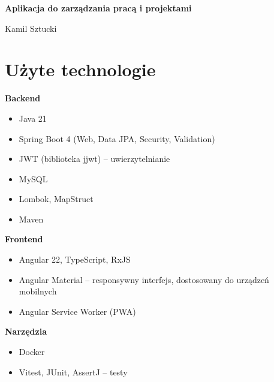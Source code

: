 \documentclass[12pt,a4paper]{article}
\begin{document}
\begin{center}
  {\LARGE \textbf{Aplikacja do zarządzania pracą i projektami}}
\end{center}

\vspace{1em}

Kamil Sztucki
\section*{Użyte technologie}

\textbf{Backend}
\begin{itemize}
  \item Java 21
  \item Spring Boot 4 (Web, Data JPA, Security, Validation)
  \item JWT (biblioteka jjwt) -- uwierzytelnianie
  \item MySQL
  \item Lombok, MapStruct
  \item Maven
\end{itemize}

\textbf{Frontend}
\begin{itemize}
  \item Angular 22, TypeScript, RxJS
  \item Angular Material -- responsywny interfejs, dostosowany do urządzeń mobilnych
  \item Angular Service Worker (PWA)
\end{itemize}

\textbf{Narzędzia}
\begin{itemize}
  \item Docker
  \item Vitest, JUnit, AssertJ -- testy
\end{itemize}
\end{document}
